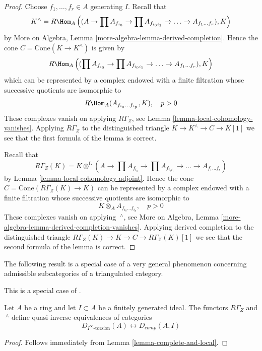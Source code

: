 \begin{proof}
Choose $f_1, \ldots, f_r \in A$ generating $I$. Recall that
$$
K^\wedge = R\Hom_A\left((A \to \prod A_{f_{i_0}}
\to \prod A_{f_{i_0i_1}} \to \ldots \to A_{f_1 \ldots f_r}), K\right)
$$
by More on Algebra, Lemma \ref{more-algebra-lemma-derived-completion}.
Hence the cone $C = \text{Cone}(K \to K^\wedge)$
is given by
$$
R\Hom_A\left((\prod A_{f_{i_0}}
\to \prod A_{f_{i_0i_1}} \to \ldots \to A_{f_1 \ldots f_r}), K\right)
$$
which can be represented by a complex endowed with a finite filtration
whose successive quotients are isomorphic to
$$
R\Hom_A(A_{f_{i_0} \ldots f_{i_p}}, K), \quad p > 0
$$
These complexes vanish on applying $R\Gamma_Z$, see
Lemma \ref{lemma-local-cohomology-vanishes}. Applying $R\Gamma_Z$
to the distinguished triangle $K \to K^\wedge \to C \to K[1]$
we see that the first formula of the lemma is correct.

\medskip\noindent
Recall that
$$
R\Gamma_Z(K) =
K \otimes^\mathbf{L} (A \to \prod A_{f_{i_0}}
\to \prod A_{f_{i_0i_1}} \to \ldots \to A_{f_1 \ldots f_r})
$$
by Lemma \ref{lemma-local-cohomology-adjoint}.
Hence the cone $C = \text{Cone}(R\Gamma_Z(K) \to K)$
can be represented by a complex endowed with a finite filtration
whose successive quotients are isomorphic to
$$
K \otimes_A A_{f_{i_0} \ldots f_{i_p}}, \quad p > 0
$$
These complexes vanish on applying ${\ }^\wedge$, see
More on Algebra, Lemma \ref{more-algebra-lemma-derived-completion-vanishes}.
Applying derived completion to the distinguished triangle
$R\Gamma_Z(K) \to K \to C \to R\Gamma_Z(K)[1]$
we see that the second formula of the lemma is correct.
\end{proof}

\noindent
The following result is a special case of a very general phenomenon
concerning admissible subcategories of a triangulated category.

\begin{proposition}
\label{proposition-torsion-complete}
\begin{reference}
This is a special case of \cite[Theorem 1.1]{PSY}.
\end{reference}
Let $A$ be a ring and let $I \subset A$ be a finitely generated ideal.
The functors $R\Gamma_Z$ and ${\ }^\wedge$
define quasi-inverse equivalences of categories
$$
D_{I^\infty\text{-torsion}}(A) \leftrightarrow D_{comp}(A, I)
$$
\end{proposition}

\begin{proof}
Follows immediately from Lemma \ref{lemma-complete-and-local}.
\end{proof}

